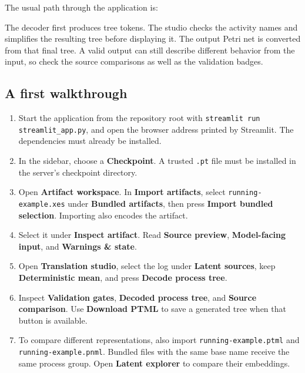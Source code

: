 \documentclass[11pt,a4paper]{article}
\newcommand{\ui}[1]{\textbf{#1}}
\newcommand{\code}[1]{\nolinkurl{#1}}
\begin{document}
The usual path through the application is:
\begin{center}
\end{center}

The decoder first produces tree tokens. The studio checks the activity names
and simplifies the resulting tree before displaying it. The output Petri net
is converted from that final tree. A valid output can still describe different behavior
from the input, so check the source comparisons as well as the validation badges.

\subsection{A first walkthrough}
\begin{enumerate}
\item Start the application from the repository root with
  \code{streamlit run streamlit_app.py}, and open the browser address printed
  by Streamlit. The dependencies must already be installed.
\item In the sidebar, choose a \ui{Checkpoint}. A trusted \code{.pt} file
  must be installed in the server's checkpoint directory.
\item Open \ui{Artifact workspace}. In \ui{Import artifacts}, select
  \code{running-example.xes} under \ui{Bundled artifacts}, then press
  \ui{Import bundled selection}. Importing also encodes the artifact.
\item Select it under \ui{Inspect artifact}. Read \ui{Source preview},
  \ui{Model-facing input}, and \ui{Warnings \& state}.
\item Open \ui{Translation studio}, select the log under \ui{Latent sources},
  keep \ui{Deterministic mean}, and press \ui{Decode process tree}.
\item Inspect \ui{Validation gates}, \ui{Decoded process tree}, and
  \ui{Source comparison}. Use \ui{Download PTML} to save a generated tree
  when that button is available.
\item To compare different representations, also import
  \code{running-example.ptml} and \code{running-example.pnml}. Bundled files
  with the same base name receive the same process group. Open
  \ui{Latent explorer} to compare their embeddings.
\end{enumerate}
\end{document}
